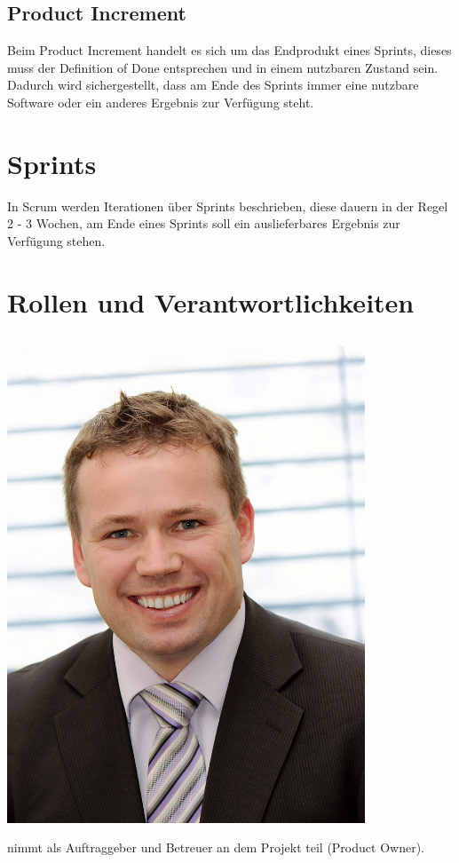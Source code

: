 \subsection{Product Increment}
Beim Product Increment handelt es sich um das Endprodukt eines Sprints, dieses muss 
der Definition of Done entsprechen und in einem nutzbaren Zustand sein.
Dadurch wird sichergestellt, dass am Ende des Sprints immer eine nutzbare Software 
oder ein anderes Ergebnis zur Verfügung steht.

\section{Sprints}
In Scrum werden Iterationen über Sprints beschrieben, diese dauern in der Regel 
2 - 3 Wochen, am Ende eines Sprints soll ein auslieferbares Ergebnis zur Verfügung 
stehen.

\section{Rollen und Verantwortlichkeiten}

\subsection{\ibuf}

\begin{minipage}[t]{0.25\textwidth}
	\vspace{0pt}
	\includegraphics[width=0.8\textwidth]{img/ivan}
\end{minipage}
\begin{minipage}[t]{0.75\textwidth}
	\vspace{0pt}
	\ibu nimmt als Auftraggeber und Betreuer an dem Projekt teil (Product Owner).
\end{minipage}

